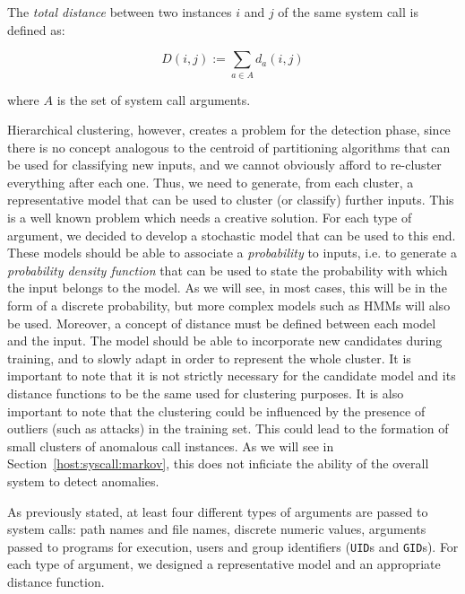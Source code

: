 \begin{definition}
  The \emph{total distance} between two instances $i$ and $j$ of the
  same system call is defined as:

  \begin{equation}
    D(i,j) := \sum_{a \in A} d_a(i,j)
    \label{eq:totaldistfunction}
  \end{equation}

  where $A$ is the set of system call arguments.
\end{definition}

Hierarchical clustering, however, creates a problem for the detection
phase, since there is no concept analogous to the centroid of
partitioning algorithms that can be used for classifying new inputs,
and we cannot obviously afford to re-cluster everything after each
one. Thus, we need to generate, from each cluster, a representative
model that can be used to cluster (or classify) further inputs. This
is a well known problem which needs a creative solution. For each type
of argument, we decided to develop a stochastic model that can be used
to this end. These models should be able to associate a
\emph{probability} to inputs, i.e. to generate a \emph{probability
  density function} that can be used to state the probability with
which the input belongs to the model. As we will see, in most cases,
this will be in the form of a discrete probability, but more complex
models such as \acp{HMM} will also be used. Moreover, a
concept of distance must be defined between each model and the
input. The model should be able to incorporate new candidates during
training, and to slowly adapt in order to represent the whole
cluster. It is important to note that it is not strictly necessary for
the candidate model and its distance functions to be the same used for
clustering purposes. It is also important to note that the clustering
could be influenced by the presence of outliers (such as attacks) in
the training set. This could lead to the formation of small clusters
of anomalous call instances. As we will see in
Section~\ref{host:syscall:markov}, this does not inficiate the ability
of the overall system to detect anomalies.

As previously stated, at least four different types of arguments are
passed to system calls: path names and file names, discrete numeric
values, arguments passed to programs for execution, users and group
identifiers (\texttt{UID}s and \texttt{GID}s). For each type of
argument, we designed a representative model and an appropriate
distance function.

